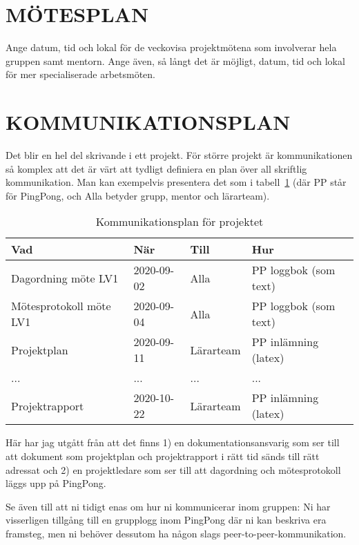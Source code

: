 \documentclass[a4paper]{article}
\begin{document}
\section{MÖTESPLAN}


Ange datum, tid och lokal för de veckovisa projektmötena som involverar
hela gruppen samt mentorn. Ange även, så långt det är möjligt, datum,
tid och lokal för mer specialiserade arbetsmöten.



\section{KOMMUNIKATIONSPLAN}


Det blir en hel del skrivande i ett projekt. För större projekt är
kommunikationen så komplex att det är värt att tydligt definiera en plan
över all skriftlig kommunikation. Man kan exempelvis presentera det som
i tabell \ref{tab:kommunikationsplan} (där PP står för PingPong, och Alla
betyder grupp, mentor och lärarteam).

\begin{table}[]
    \centering
    \begin{tabular}{|l|l|l|l|}
    \hline
        Vad & När & Till & Hur \\ 
        \hline
        \hline
        Dagordning möte LV1 & 2020-09-02 & Alla & PP loggbok (som text) \\ 
        \hline
        Mötesprotokoll möte LV1 & 2020-09-04 & Alla & PP loggbok (som text) \\
        \hline
        Projektplan & 2020-09-11 & Lärarteam & PP inlämning (latex) \\
        \hline
        ... & ... & ... & ... \\
        \hline
        Projektrapport & 2020-10-22 & Lärarteam & PP inlämning (latex) \\
        \hline
    \end{tabular}
    \caption{Kommunikationsplan för projektet}
    \label{tab:kommunikationsplan}
\end{table}

Här har jag utgått från att det finns 1) en dokumentationsansvarig som
ser till att dokument som projektplan och projektrapport i rätt tid
sänds till rätt adressat och 2) en projektledare som ser till att
dagordning och mötesprotokoll läggs upp på PingPong.

Se även till att ni tidigt enas om hur ni kommunicerar inom gruppen:
Ni har visserligen tillgång till en grupplogg inom PingPong där ni kan
beskriva era framsteg, men ni behöver dessutom ha någon slags
peer-to-peer-kommunikation.
\end{document}
